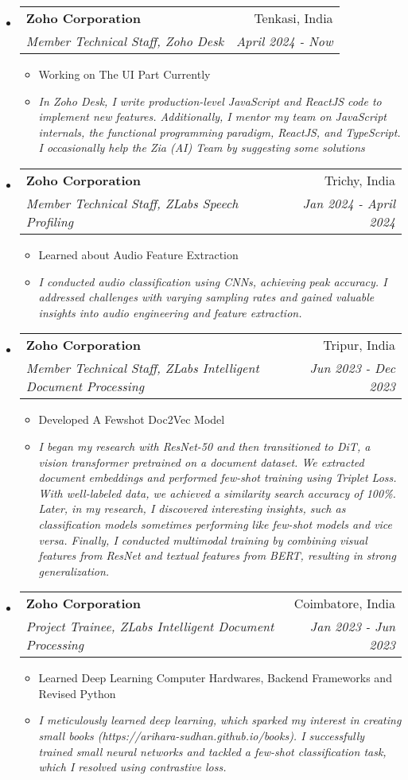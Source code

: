 \documentclass[letterpaper,11pt]{article}
\makeatletter
\newcommand{\resitem}[1]{\item #1 \vspace{-2pt}}
\newcommand{\resheading}[1]{\textbf{\sffamily{\mbox{~}{\large #1} \vphantom{p\^{E}}}}}
\newcommand{\ressubheading}[4]{
\begin{tabular*}{6.5in}{l@{\extracolsep{\fill}}r}
		\textbf{#1} & #2 \\
		\textit{#3} & \textit{#4} \\
\end{tabular*}\vspace{-6pt}}
\makeatother
\begin{document}
\vspace{0.05in}
\resheading{Work Experience}
\begin{itemize}
\item[]
	\ressubheading{Zoho Corporation}{Tenkasi, India}{Member Technical Staff, Zoho Desk}{April 2024 - Now}
	\begin{itemize}
		\resitem{Working on The UI Part Currently}
		\resitem{\textit{In Zoho Desk, I write production-level JavaScript and ReactJS code to implement new features. Additionally, I mentor my team on JavaScript internals, the functional programming paradigm, ReactJS, and TypeScript. I occasionally help the Zia (AI) Team by suggesting some solutions}}
	\end{itemize}

\item[]
	\ressubheading{Zoho Corporation}{Trichy, India}{Member Technical Staff, ZLabs Speech Profiling}{Jan 2024 - April 2024}
	\begin{itemize}
		\resitem{Learned about Audio Feature Extraction}
		\resitem{\textit{I conducted audio classification using CNNs, achieving peak accuracy. I addressed challenges with varying sampling rates and gained valuable insights into audio engineering and feature extraction.}}
	\end{itemize}
	
\item[]
	\ressubheading{Zoho Corporation}{Tripur, India}{Member Technical Staff, ZLabs Intelligent Document Processing}{Jun 2023 - Dec 2023}
	\begin{itemize}
		\resitem{Developed A Fewshot Doc2Vec Model}
		\resitem{\textit{I began my research with ResNet-50 and then transitioned to DiT, a vision transformer pretrained on a document dataset. We extracted document embeddings and performed few-shot training using Triplet Loss. With well-labeled data, we achieved a similarity search accuracy of 100\%. Later, in my research, I discovered interesting insights, such as classification models sometimes performing like few-shot models and vice versa. Finally, I conducted multimodal training by combining visual features from ResNet and textual features from BERT, resulting in strong generalization.}}
	\end{itemize}

\item[]
	\ressubheading{Zoho Corporation}{Coimbatore, India}{Project Trainee, ZLabs Intelligent Document Processing}{Jan 2023 - Jun 2023}
	\begin{itemize}
		\resitem{Learned Deep Learning Computer Hardwares, Backend Frameworks and Revised Python}
		\resitem{\textit{I meticulously learned deep learning, which sparked my interest in creating small books (https://arihara-sudhan.github.io/books). I successfully trained small neural networks and tackled a few-shot classification task, which I resolved using contrastive loss.}}
	\end{itemize}

\end{itemize}
\end{document}
